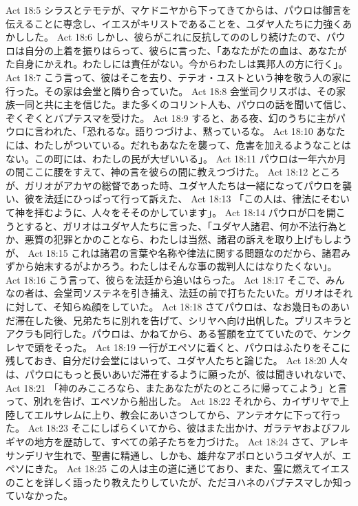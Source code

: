 Act 18:5  シラスとテモテが、マケドニヤから下ってきてからは、パウロは御言を伝えることに専念し、イエスがキリストであることを、ユダヤ人たちに力強くあかしした。
Act 18:6  しかし、彼らがこれに反抗してののしり続けたので、パウロは自分の上着を振りはらって、彼らに言った、「あなたがたの血は、あなたがた自身にかえれ。わたしには責任がない。今からわたしは異邦人の方に行く」。
Act 18:7  こう言って、彼はそこを去り、テテオ・ユストという神を敬う人の家に行った。その家は会堂と隣り合っていた。
Act 18:8  会堂司クリスポは、その家族一同と共に主を信じた。また多くのコリント人も、パウロの話を聞いて信じ、ぞくぞくとバプテスマを受けた。
Act 18:9  すると、ある夜、幻のうちに主がパウロに言われた、「恐れるな。語りつづけよ、黙っているな。
Act 18:10  あなたには、わたしがついている。だれもあなたを襲って、危害を加えるようなことはない。この町には、わたしの民が大ぜいいる」。
Act 18:11  パウロは一年六か月の間ここに腰をすえて、神の言を彼らの間に教えつづけた。
Act 18:12  ところが、ガリオがアカヤの総督であった時、ユダヤ人たちは一緒になってパウロを襲い、彼を法廷にひっぱって行って訴えた、
Act 18:13  「この人は、律法にそむいて神を拝むように、人々をそそのかしています」。
Act 18:14  パウロが口を開こうとすると、ガリオはユダヤ人たちに言った、「ユダヤ人諸君、何か不法行為とか、悪質の犯罪とかのことなら、わたしは当然、諸君の訴えを取り上げもしようが、
Act 18:15  これは諸君の言葉や名称や律法に関する問題なのだから、諸君みずから始末するがよかろう。わたしはそんな事の裁判人にはなりたくない」。
Act 18:16  こう言って、彼らを法廷から追いはらった。
Act 18:17  そこで、みんなの者は、会堂司ソステネを引き捕え、法廷の前で打ちたたいた。ガリオはそれに対して、そ知らぬ顔をしていた。
Act 18:18  さてパウロは、なお幾日ものあいだ滞在した後、兄弟たちに別れを告げて、シリヤへ向け出帆した。プリスキラとアクラも同行した。パウロは、かねてから、ある誓願を立てていたので、ケンクレヤで頭をそった。
Act 18:19  一行がエペソに着くと、パウロはふたりをそこに残しておき、自分だけ会堂にはいって、ユダヤ人たちと論じた。
Act 18:20  人々は、パウロにもっと長いあいだ滞在するように願ったが、彼は聞きいれないで、
Act 18:21  「神のみこころなら、またあなたがたのところに帰ってこよう」と言って、別れを告げ、エペソから船出した。
Act 18:22  それから、カイザリヤで上陸してエルサレムに上り、教会にあいさつしてから、アンテオケに下って行った。
Act 18:23  そこにしばらくいてから、彼はまた出かけ、ガラテヤおよびフルギヤの地方を歴訪して、すべての弟子たちを力づけた。
Act 18:24  さて、アレキサンデリヤ生れで、聖書に精通し、しかも、雄弁なアポロというユダヤ人が、エペソにきた。
Act 18:25  この人は主の道に通じており、また、霊に燃えてイエスのことを詳しく語ったり教えたりしていたが、ただヨハネのバプテスマしか知っていなかった。
